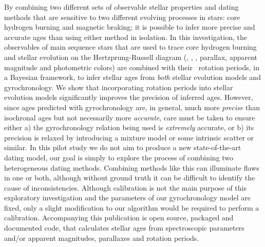

By combining two different sets of observable stellar properties and dating
methods that are sensitive to two different evolving processes in stars: core
hydrogen burning and magnetic braking; it is possible to infer more precise
and accurate ages than using either method in isolation.
In this investigation, the observables of main sequence stars that are used to
trace core hydrogen burning and stellar evolution on the Hertzprung-Russell
diagram (\teff, \feh, \logg, parallax, apparent magnitude and photometric
colors) are combined with their \kepler\ rotation periods, in a Bayesian
framework, to infer stellar ages from {\it both} stellar evolution models and
gyrochronology.
We show that incorporating rotation periods into stellar evolution models
significantly improves the precision of inferred ages.
However, since ages predicted with gyrochronology are, in general, much more
{\it precise} than isochronal ages but not necessarily more {\it accurate},
care must be taken to ensure either a) the gyrochronology relation being used
is {\it extremely} accurate, or b) its precision is relaxed by introducing a
mixture model or some intrinsic scatter or similar.
In this pilot study we do not aim to produce a new state-of-the-art dating
model, our goal is simply to explore the process of combining two
heterogeneous dating methods.
Combining methods like this can illuminate flaws in one or both, although
without ground truth it can be difficult to identify the cause of
inconsistencies.
Although calibration is not the main purpose of this exploratory investigation
and the parameters of our gyrochronology model are fixed, only a slight
modification to our algorithm would be required to perform a calibration.
Accompanying this publication is open source, packaged and documented code,
that calculates stellar ages from spectroscopic parameters and/or apparent
magnitudes, parallaxes and rotation periods.

